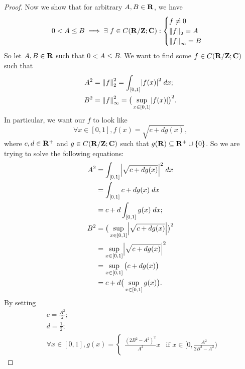 \begin{proof}
    Now we show that for arbitrary \(A, B \in \R\), we have
    \[
        0 < A \leq B \implies \exists\ f \in C(\R / \Z ; \C) : \begin{cases}
            f \neq 0        \\
            \norm*{f}_2 = A \\
            \norm*{f}_{\infty} = B
        \end{cases}
    \]
    So let \(A, B \in \R\) such that \(0 < A \leq B\).
    We want to find some \(f \in C(\R / \Z ; \C)\) such that
    \begin{align*}
        A^2 & = \norm*{f}_2^2 = \int_{[0, 1]} \abs{f(x)}^2 \; dx;                  \\
        B^2 & = \norm*{f}_{\infty}^2 = \big(\sup_{x \in [0, 1]} \abs{f(x)}\big)^2.
    \end{align*}
    In particular, we want our \(f\) to look like
    \[
        \forall x \in [0, 1], f(x) = \sqrt{c + d g(x)},
    \]
    where \(c, d \in \R^+\) and \(g \in C(\R / \Z ; \C)\) such that \(g(\R) \subseteq \R^+ \cup \{0\}\).
    So we are trying to solve the following equations:
    \begin{align*}
        A^2 & = \int_{[0, 1]} \abs{\sqrt{c + dg(x)}}^2 \; dx           \\
            & = \int_{[0, 1]} c + dg(x) \; dx                          \\
            & = c + d \int_{[0, 1]} g(x) \; dx;                        \\
        B^2 & = \big(\sup_{x \in [0, 1]} \abs{\sqrt{c + dg(x)}}\big)^2 \\
            & = \sup_{x \in [0, 1]} \abs{\sqrt{c + dg(x)}}^2           \\
            & = \sup_{x \in [0, 1]} \big(c + dg(x)\big)                \\
            & = c + d \big(\sup_{x \in [0, 1]} g(x)\big).
    \end{align*}
    By setting
    \begin{align*}
         & c = \frac{A^2}{2};                                                                                                                                    \\
         & d = \frac{1}{2};                                                                                                                                      \\
         & \forall x \in [0, 1], g(x) = \begin{cases}
                                            \frac{(2 B^2 - A^2)^2}{A^2} x                    & \text{if } x \in [0, \frac{A^2}{2 B^2 - A^2})                         \\

\end{cases}
\end{align*}
\end{proof}
